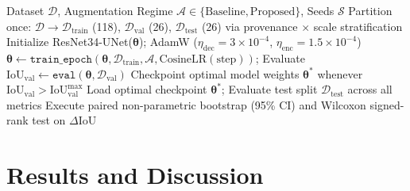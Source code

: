 \documentclass[10pt,a4paper]{article}
\begin{document}
\begin{algorithm}[htbp]
\caption{Pedestrian U-Net Training and Paired Evaluation Protocol}
\label{alg:training}
\begin{algorithmic}[1]
\Require Dataset $\mathcal{D}$, Augmentation Regime $\mathcal{A} \in \{\text{Baseline}, \text{Proposed}\}$, Seeds $\mathcal{S}$
\State Partition once: $\mathcal{D} \to \mathcal{D}_{\text{train}}$ (118), $\mathcal{D}_{\text{val}}$ (26), $\mathcal{D}_{\text{test}}$ (26) via provenance $\times$ scale stratification
    \State Initialize ResNet34-UNet($\bm{\theta}$); AdamW ($\eta_{\text{dec}} = 3\times 10^{-4}$, $\eta_{\text{enc}} = 1.5\times 10^{-4}$)
        \State $\bm{\theta} \gets \mathtt{train\_epoch}(\bm{\theta}, \mathcal{D}_{\text{train}}, \mathcal{A}, \text{CosineLR}(\text{step}))$; Evaluate $\text{IoU}_{\text{val}} \gets \mathtt{eval}(\bm{\theta}, \mathcal{D}_{\text{val}})$
        \State Checkpoint optimal model weights $\bm{\theta}^*$ whenever $\text{IoU}_{\text{val}} > \text{IoU}_{\text{val}}^{\max}$
    \EndFor
    \State Load optimal checkpoint $\bm{\theta}^*$; Evaluate test split $\mathcal{D}_{\text{test}}$ across all metrics
\EndFor
\State Execute paired non-parametric bootstrap (95\% CI) and Wilcoxon signed-rank test on $\Delta \text{IoU}$
\end{algorithmic}
\end{algorithm}

\section{Results and Discussion}
\end{document}
